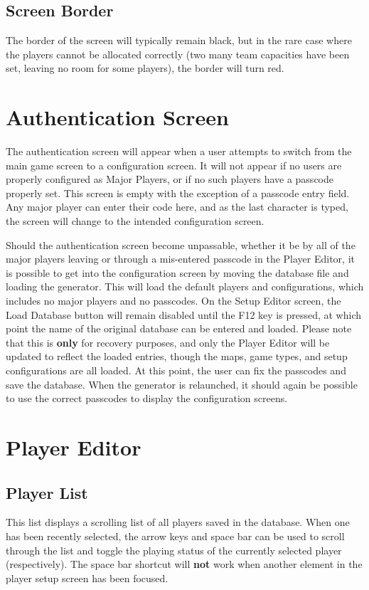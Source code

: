 \documentclass[10pt,a4paper]{report}
\begin{document}
\subsection{Screen Border}
The border of the screen will typically remain black, but in the rare case where the players cannot be allocated correctly (two many team capacities have been set, leaving no room for some players), the border will turn red.

\section{Authentication Screen}
The authentication screen will appear when a user attempts to switch from the main game screen to a configuration screen.  It will not appear if no users are properly configured as Major Players, or if no such players have a passcode properly set.  This screen is empty with the exception of a passcode entry field.  Any major player can enter their code here, and as the last character is typed, the screen will change to the intended configuration screen.

Should the authentication screen become unpassable, whether it be by all of the major players leaving or through a mis-entered passcode in the Player Editor, it is possible to get into the configuration screen by moving the database file and loading the generator.  This will load the default players and configurations, which includes no major players and no passcodes.  On the Setup Editor screen, the Load Database button will remain disabled until the F12 key is pressed, at which point the name of the original database can be entered and loaded.  Please note that this is \textbf{only} for recovery purposes, and only the Player Editor will be updated to reflect the loaded entries, though the maps, game types, and setup configurations are all loaded.  At this point, the user can fix the passcodes and save the database.  When the generator is relaunched, it should again be possible to use the correct passcodes to display the configuration screens.

\section{Player Editor}
\subsection{Player List}
This list displays a scrolling list of all players saved in the database.  When one has been recently selected, the arrow keys and space bar can be used to scroll through the list and toggle the playing status of the currently selected player (respectively).  The space bar shortcut will \textbf{not} work when another element in the player setup screen has been focused.
\end{document}
